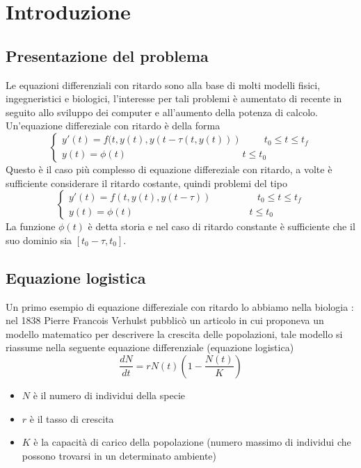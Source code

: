 

\chapter{Introduzione}

\section{Presentazione del problema}
Le equazioni differenziali con ritardo sono alla base di molti modelli fisici, ingegneristici e biologici, 
l'interesse per tali problemi è aumentato di recente in seguito allo sviluppo dei computer e all'aumento 
della potenza di calcolo. Un'equazione differeziale con ritardo è della forma
$$
\begin{cases}
 y'(t) = f(t,y(t),y(t- \tau (t,y(t)))	\hspace{1cm}	t_0 \le t \le t_f \\
 y(t)=\phi(t)				\hspace{5cm}	t \le t_0
\end{cases}
$$
Questo è il caso più complesso di equazione differeziale con ritardo, a volte è sufficiente considerare 
il ritardo costante, quindi problemi del tipo
$$
\begin{cases}
 y'(t) = f(t,y(t),y(t- \tau))		\hspace{2cm}	t_0 \le t \le t_f \\
 y(t)=\phi(t)				\hspace{5cm}	t \le t_0
\end{cases}
$$
La funzione $\phi(t)$ è detta storia e nel caso di ritardo constante è sufficiente che il suo 
dominio sia $[t_0-\tau,t_0]$.

\section{Equazione logistica}
Un primo esempio di equazione differeziale con ritardo lo abbiamo nella biologia \cite[pag. 9-13]{1}: nel 
1838 Pierre Francois Verhulst pubblicò un articolo in cui proponeva un modello matematico per 
descrivere la crescita delle popolazioni, tale modello si riassume nella seguente equazione 
differenziale (equazione logistica)
$$
\frac{d N}{d t} = r N(t) \left(1 - \frac{N(t)}{K} \right)
$$
\begin{itemize}
 \item $N$ è il numero di individui della specie
 \item $r$ è il tasso di crescita
 \item $K$ è la capacità di carico della popolazione (numero massimo di individui 
	      che possono trovarsi in un determinato ambiente)
\end{itemize}



